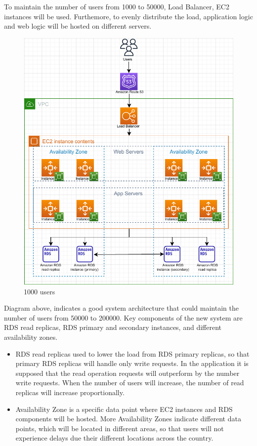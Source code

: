 To maintain the number of users from 1000 to 50000, Load Balancer, EC2 instances will be used. Furthemore, to evenly distribute the load, application logic and web logic will be hosted on different servers.

\begin{figure}[h]
    \centering
    \includegraphics[scale=0.85]{figures/d3.pdf}
    \caption{1000 users}
    \label{fig:gp}
\end{figure}

Diagram above, indicates a good system architecture that could maintain the number of users from 50000 to 200000. Key components of the new system are RDS read replicas, RDS primary and secondary instances, and different availability zones.

\begin{itemize}
  \item RDS read replicas used to lower the load from RDS primary replicas, so that primary RDS replicas will handle only write requests. In the application it is supposed that the read operation requests will outperform by the number write requests. When the number of users will increase, the number of read replicas will increase proportionally.
  \item Availability Zone is a specific data point where EC2 instances and RDS components will be hosted. More Availability Zones indicate different data points, which will be located in different areas, so that users will not experience delays due their different locations across the country.
\end{itemize}


